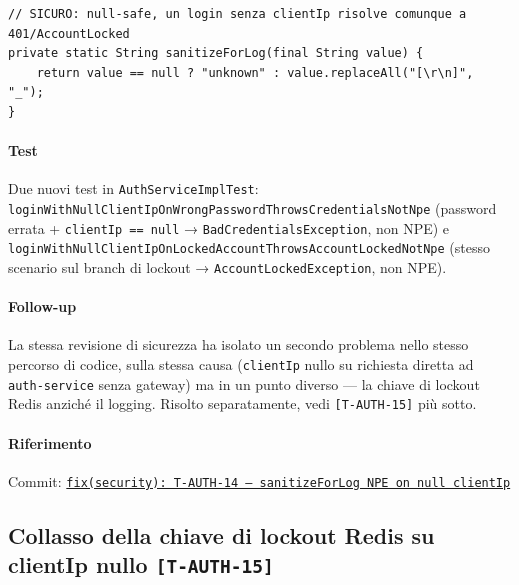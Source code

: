 ﻿\documentclass[a4paper,12pt]{report}
\newcommand{\commitref}[2]{\texttt{\small \href{https://github.com/diegoandruccioli/hotel-pms/commit/#1}{#2}}}
\newcommand{\threat}[1]{\texttt{\small\textcolor{vulnred}{[#1]}}}
\begin{document}
\begin{securebox}[title={Codice Sicuro --- AuthServiceImpl.java (fix)}]
\begin{lstlisting}[style=java]
// SICURO: null-safe, un login senza clientIp risolve comunque a 401/AccountLocked
private static String sanitizeForLog(final String value) {
    return value == null ? "unknown" : value.replaceAll("[\r\n]", "_");
}
\end{lstlisting}
\end{securebox}

\paragraph{Test}
Due nuovi test in \texttt{AuthServiceImplTest}:
\texttt{loginWithNullClientIpOnWrongPasswordThrowsCredentialsNotNpe} (password
errata + \texttt{clientIp == null} → \texttt{BadCredentialsException}, non NPE) e
\texttt{loginWithNullClientIpOnLockedAccountThrowsAccountLockedNotNpe} (stesso
scenario sul branch di lockout → \texttt{AccountLockedException}, non NPE).

\paragraph{Follow-up}
La stessa revisione di sicurezza ha isolato un secondo problema nello stesso
percorso di codice, sulla stessa causa (\texttt{clientIp} nullo su richiesta
diretta ad \texttt{auth-service} senza gateway) ma in un punto diverso ---
la chiave di lockout Redis anziché il logging. Risolto separatamente,
vedi \threat{T-AUTH-15} più sotto.

\paragraph{Riferimento} Commit: \commitref{d6b113a}{fix(security): T-AUTH-14 --- sanitizeForLog NPE on null clientIp}

\subsection{Collasso della chiave di lockout Redis su clientIp nullo \threat{T-AUTH-15}}
\end{document}

